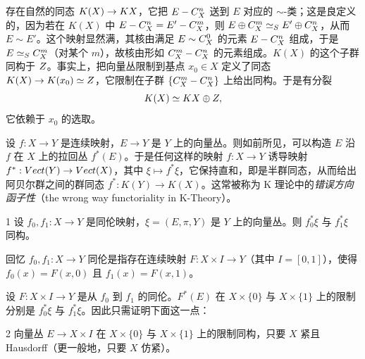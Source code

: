 
存在自然的同态 $K(X)\to KX$，它把 $E-C^n_X$ 送到 $E$ 对应的 $\sim$-类；这是良定义的，因为若在 $K(X)$ 中 $E-C^n_X=E'-C^m_X$，则 $E\oplus C^m_X\simeq_S E'\oplus C^n_X$，从而 $E\sim E'$。这个映射显然满，其核由满足 $E\sim C^0_X$ 的元素 $E-C^n_X$ 组成，于是 $E\simeq_SC^m_X$（对某个 $m$），故核由形如 $C^m_X-C^n_X$ 的元素组成。$K(X)$ 的这个子群同构于 $Z$。事实上，把向量丛限制到基点 $x_0\in X$ 定义了同态 $K(X)\to K(x_0)\simeq Z$，它限制在子群 $\{C^m_X-C^n_X\}$ 上给出同构。于是有分裂
\[ K(X)\simeq KX\oplus Z, \]
它依赖于 $x_0$ 的选取。


设 $f: X\to Y$ 是连续映射，$E\to Y$ 是 $Y$ 上的向量丛。则如前所见，可以构造 $E$ 沿 $f$ 在 $X$ 上的拉回丛 $f^*(E)$。于是任何这样的映射 $f: X\to Y$ 诱导映射 $f^*: Vect(Y)\to Vect(X)$，其中 $\xi\mapsto f^*\xi$，它保持直和，即是半群同态，从而给出阿贝尔群之间的群同态
$f^*: K(Y)\to K(X)$。这常被称为 K 理论中的\emph{错误方向函子性}（the wrong way functoriality in K-Theory）。

\begin{thm}{1}
设 $f_0,f_1: X\to Y$ 是同伦映射，$\xi=(E,\pi,Y)$ 是 $Y$ 上的向量丛。则 $f_0^*\xi$ 与 $f_1^*\xi$ 同构。
\end{thm}

回忆 $f_0,f_1: X\to Y$ 同伦是指存在连续映射 $F: X\times I\to Y$（其中 $I=[0,1]$），使得 $f_0(x)=F(x,0)$ 且 $f_1(x)=F(x,1)$。

设 $F: X\times I\to Y$ 是从 $f_0$ 到 $f_1$ 的同伦。$F^*(E)$ 在 $X\times\{0\}$ 与 $X\times\{1\}$ 上的限制分别是 $f_0^*\xi$ 与 $f_1^*\xi$。因此只需证明下面这一点：


\begin{lem}{2}
向量丛 $E\to X\times I$ 在 $X\times\{0\}$ 与 $X\times\{1\}$ 上的限制同构，只要 $X$ 紧且 Hausdorff（更一般地，只要 $X$ 仿紧）。
\end{lem}

